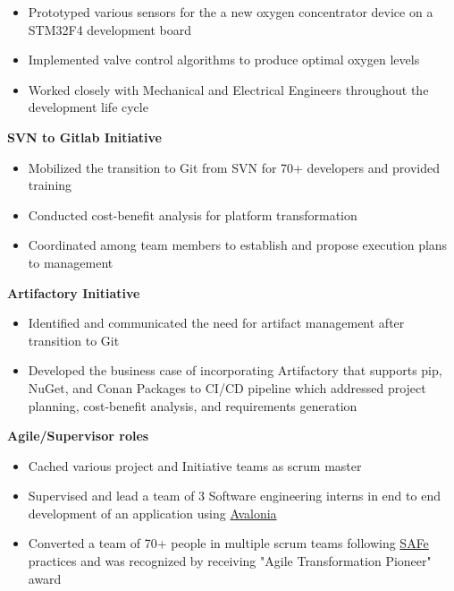 \begin{cventries}
{\begin{cvitems}
{\begin{itemize}
        \item Prototyped various sensors for the a new oxygen concentrator device on a STM32F4 development board 
        \item Implemented valve control algorithms to produce optimal oxygen levels 
        \item Worked closely with Mechanical and Electrical Engineers throughout the development life cycle 
    \end{itemize} 
}
\item 
{
    \textbf{SVN to Gitlab Initiative} 
    \begin{itemize}
        \item Mobilized the transition to Git from SVN for 70+ developers and provided training
        \item Conducted cost-benefit analysis for platform transformation 
        \item Coordinated among team members to establish and propose execution plans to management 
    \end{itemize} 
}
\item 
{
    \textbf{Artifactory Initiative}
    \begin{itemize}
        \item Identified and communicated the need for artifact management after transition to Git
        \item Developed the business case of incorporating Artifactory that supports pip, NuGet, and Conan Packages to CI/CD pipeline which addressed 
        project planning, cost-benefit analysis, and requirements generation
    \end{itemize} 
}
\item 
{
    \textbf{Agile/Supervisor roles} 
    \begin{itemize}
        \item Cached various project and Initiative teams as scrum master 
        \item Supervised and lead a team of 3 Software engineering interns in end to end development of an application using \href{https://avaloniaui.net/}{\color{RoyalBlue}Avalonia}
        \item Converted a team of 70+ people in multiple scrum teams following \href{https://www.scaledagileframework.com/}{\color{RoyalBlue}SAFe} practices and was
        recognized by receiving "Agile Transformation Pioneer" award
    \end{itemize} 
}
\end{cvitems}
}



\end{cventries}
